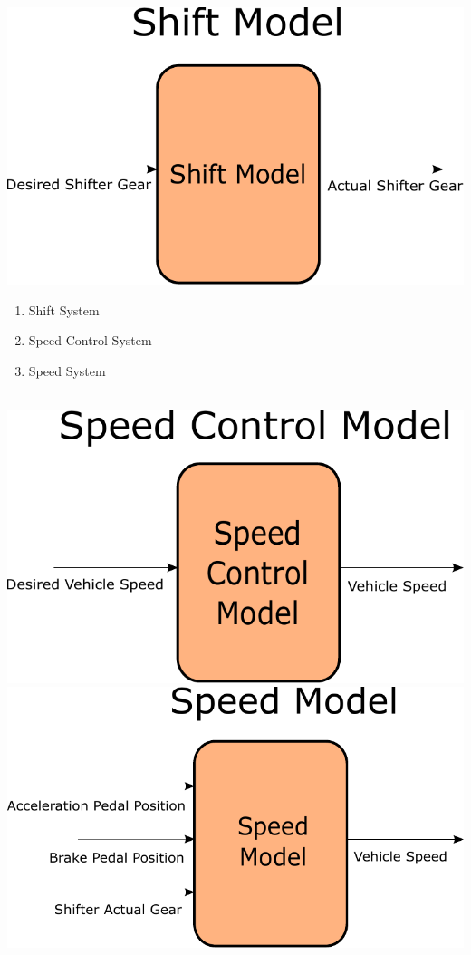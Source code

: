 \documentclass{beamer}
\begin{document}
\begin{frame}
\centering
\includegraphics[width=.45\linewidth]{figs/inkscape/shiftModelArchitecture}\quad%
\begin{minipage}[b][0.4\textheight][c]{.45\linewidth} \begin{enumerate} \item Shift System \item Speed Control System \item Speed System \end{enumerate} \end{minipage}\\[1em]
\includegraphics[width=.45\linewidth]{figs/inkscape/speedControlModelArchitecture}\quad%
\includegraphics[width=.45\linewidth]{figs/inkscape/speedModelArchitecture}
\end{frame}
\end{document}
